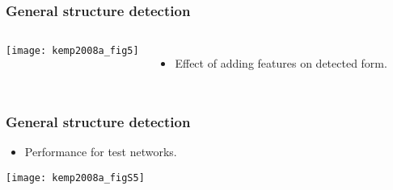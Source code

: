 \begin{frame}
  \frametitle{General structure detection}
  
  \begin{columns}
    \texttt{[image: kemp2008a\_fig5]}
    \begin{itemize}
    \item<1-> 
      Effect of adding features on detected form.
      \bigskip
    \end{itemize}
  \end{columns}

\end{frame}

\begin{frame}
  \frametitle{General structure detection}

  \begin{itemize}
  \item<1->
    Performance for test networks.
  \end{itemize}
  
  \texttt{[image: kemp2008a\_figS5]}

\end{frame}




